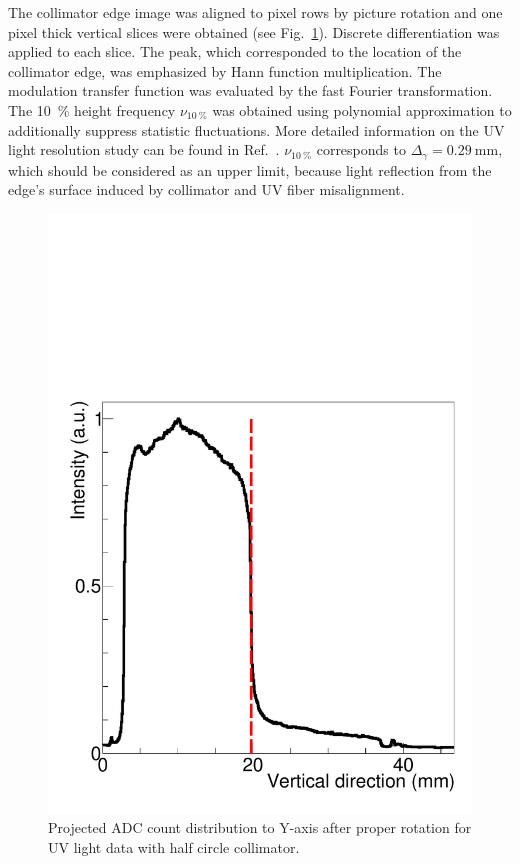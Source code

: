 \documentclass[preprint,3p,twocolumn]{elsarticle}
\begin{document}
The collimator edge image was aligned to pixel rows by picture rotation and 
one pixel thick vertical slices were obtained (see Fig.~\ref{fig:half_circle}).
Discrete differentiation was applied to each slice.
The peak,
which corresponded to the location of the collimator edge,
was emphasized by Hann function multiplication.
The modulation transfer function was evaluated by the fast Fourier transformation.
The \SI{10}{\percent} height frequency $\nu_{\SI{10}{\percent}}$ was obtained using polynomial approximation to additionally suppress statistic fluctuations.
More detailed information on the UV light resolution study can be found in Ref.~\cite{Gosha}.
$\nu_{\SI{10}{\percent}}$ corresponds to $\Delta_\gamma = \SI{0.29}{\mm}$,
which should be considered as an upper limit,
because light reflection from the edge's surface induced by collimator and UV fiber misalignment.

\begin{figure}[tbp]
    \centering
	\includegraphics[width=\columnwidth]{figure/edge_image_w_uv_4_BH_axis.pdf}
	\caption{Projected ADC count distribution to Y-axis after proper rotation for UV light data with half circle collimator.}
	\label{fig:half_circle}
\end{figure}
\end{document}
